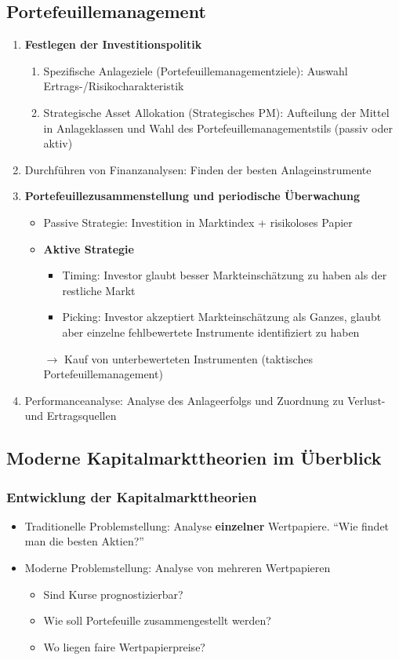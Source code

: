 \subsection{Portefeuillemanagement}
\begin{enumerate}
	\item \textbf{Festlegen der Investitionspolitik}
	\begin{enumerate}
		\item Spezifische Anlageziele (Portefeuillemanagementziele): Auswahl Ertrags-/Risikocharakteristik
		\item Strategische Asset Allokation (Strategisches PM): Aufteilung der Mittel in Anlageklassen und Wahl des Portefeuillemanagementstils (passiv oder aktiv)
	\end{enumerate}
	\item Durchführen von Finanzanalysen: Finden der besten Anlageinstrumente
	\item \textbf{Portefeuillezusammenstellung und periodische Überwachung}
	\begin{itemize}
		\item Passive Strategie: Investition in Marktindex + risikoloses Papier
		\item \textbf{Aktive Strategie}
		\begin{itemize}
			\item Timing: Investor glaubt besser Markteinschätzung zu haben als der restliche Markt
			\item Picking: Investor akzeptiert Markteinschätzung als Ganzes, glaubt aber einzelne fehlbewertete Instrumente identifiziert zu haben
		\end{itemize}
		$\rightarrow$ Kauf von unterbewerteten Instrumenten (taktisches Portefeuillemanagement)
	\end{itemize}
	\item Performanceanalyse: Analyse des Anlageerfolgs und Zuordnung zu Verlust- und Ertragsquellen
\end{enumerate}


\subsection{Moderne Kapitalmarkttheorien im Überblick}

\subsubsection{Entwicklung der Kapitalmarkttheorien}
\begin{itemize}
	\item Traditionelle Problemstellung: Analyse \textbf{einzelner} Wertpapiere. "`Wie findet man die besten Aktien?"'
	\item Moderne Problemstellung: Analyse von mehreren Wertpapieren
	\begin{itemize}
		\item Sind Kurse prognostizierbar?
		\item Wie soll Portefeuille zusammengestellt werden?
		\item Wo liegen faire Wertpapierpreise?
	\end{itemize}
\end{itemize}

